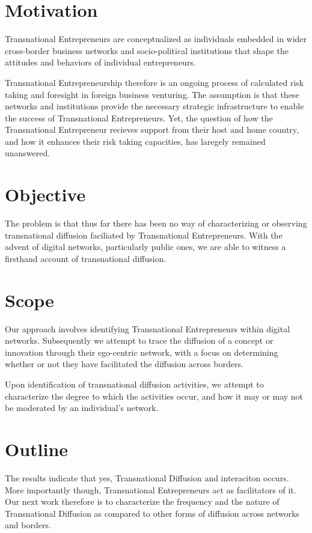 \section{Motivation}
Transnational Entrepreneurs are conceptualized as individuals embedded
in wider cross-border business networks and socio-political
institutions that shape the attitudes and behaviors of individual
entrepreneurs.

Transnational Entrepreneurship therefore is an ongoing process of
calculated risk taking and foresight in foreign business
venturing. The assumption is that these networks and institutions
provide the necessary strategic infrastructure to enable the success
of Transnational Entrepreneurs. Yet, the question of how the
Transnational Entrepreneur recieves support from their host and home
country, and how it enhances their risk taking capacities, has
laregely remained unanswered.

\section{Objective}
The problem is that thus far there has been no way of characterizing
or observing transnational diffusion faciliated by Transnational
Entrepreneurs. With the advent of digital networks, particularly
public ones, we are able to witness a firsthand account of
transnational diffusion.

\section{Scope}
Our approach involves identifying Transnational Entrepreneurs within
digital networks. Subsequently we attempt to trace the diffusion of a
concept or innovation through their ego-centric network, with a focus
on determining whether or not they have facilitated the diffusion
across borders.

Upon identification of transnational diffusion activities, we attempt
to characterize the degree to which the activities occur, and how it
may or may not be moderated by an individual's network.

\section{Outline}
The results indicate that yes, Transnational Diffusion and interaciton
occurs. More importantly though, Transnational Entrepreneurs act as
facilitators of it. Our next work therefore is to characterize the
frequency and the nature of Transnational Diffusion as compared to
other forms of diffusion across networks and borders.


